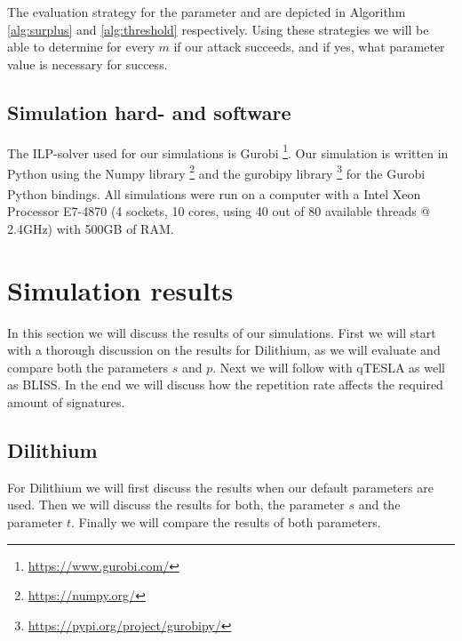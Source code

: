 
The evaluation strategy for the parameter  and  are depicted in Algorithm \ref{alg:surplus} and \ref{alg:threshold} respectively.
Using these strategies we will be able to determine for every $m$ if our attack succeeds, and if yes, what parameter value is necessary for success.

\subsection{Simulation hard- and software}
\label{sec:practise_server}
The ILP-solver used for our simulations is Gurobi \footnote{\url{https://www.gurobi.com/}}.
Our simulation is written in Python using the Numpy library \footnote{\url{https://numpy.org/}} and the gurobipy library \footnote{\url{https://pypi.org/project/gurobipy/}} for the Gurobi Python bindings. All simulations were run on a computer with a Intel\textsuperscript{\textregistered} Xeon\textsuperscript{\textregistered} Processor E7-4870 (4 sockets, 10 cores, using 40 out of 80 available threads @ 2.4GHz) with 500GB of RAM.


\section{Simulation results}
\label{sec:simresults}
In this section we will discuss the results of our simulations. First we will start with a thorough discussion on the results for Dilithium, as we will evaluate and compare both the parameters $s$ and $p$. Next we will follow with qTESLA as well as BLISS. In the end we will discuss how the repetition rate affects the required amount of signatures.

\subsection{Dilithium}
For Dilithium we will first discuss the results when our default parameters are used. Then we will discuss the results for both, the parameter $s$ and the parameter $t$. Finally we will compare the results of both parameters.

